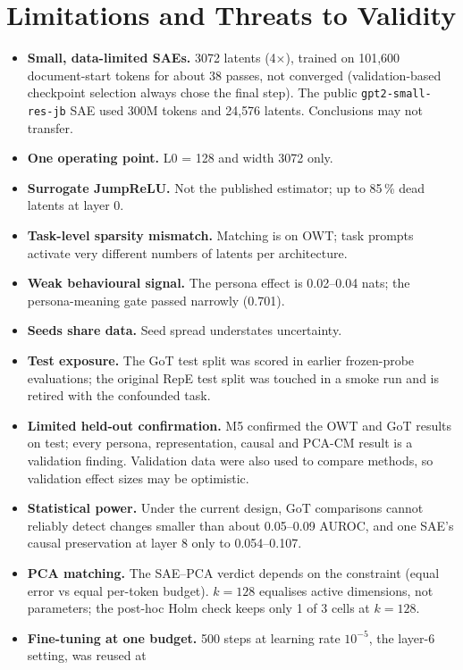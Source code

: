 \section{Limitations and Threats to Validity}\label{sec:limits}

\begin{itemize}
  \item \textbf{Small, data-limited SAEs.} 3072 latents (4$\times$), trained on 101{,}600 document-start tokens for
        about 38 passes, not converged (validation-based checkpoint selection always chose the final step). The public
        \texttt{gpt2-small-res-jb} SAE used 300M tokens and 24{,}576 latents. Conclusions may not transfer.
  \item \textbf{One operating point.} L0 = 128 and width 3072 only.
  \item \textbf{Surrogate JumpReLU.} Not the published estimator; up to 85\,\% dead latents at layer 0.
  \item \textbf{Task-level sparsity mismatch.} Matching is on OWT; task prompts activate very different numbers of
        latents per architecture.
  \item \textbf{Weak behavioural signal.} The persona effect is 0.02--0.04 nats; the persona-meaning gate passed
        narrowly (0.701).
  \item \textbf{Seeds share data.} Seed spread understates uncertainty.
  \item \textbf{Test exposure.} The GoT test split was scored in earlier frozen-probe evaluations; the original RepE
        test split was touched in a smoke run and is retired with the confounded task.
  \item \textbf{Limited held-out confirmation.} M5 confirmed the OWT and GoT results on test; every persona,
        representation, causal and PCA-CM result is a validation finding. Validation data were also used to compare
        methods, so validation effect sizes may be optimistic.
  \item \textbf{Statistical power.} Under the current design, GoT comparisons cannot reliably detect changes smaller
        than about 0.05--0.09 AUROC, and one SAE's causal preservation at layer 8 only to 0.054--0.107.
  \item \textbf{PCA matching.} The SAE--PCA verdict depends on the constraint (equal error vs equal per-token
        budget). $k=128$ equalises active dimensions, not parameters; the post-hoc Holm check keeps only 1 of 3 cells
        at $k=128$.
  \item \textbf{Fine-tuning at one budget.} 500 steps at learning rate $10^{-5}$, the layer-6 setting, was reused at

\end{itemize}
